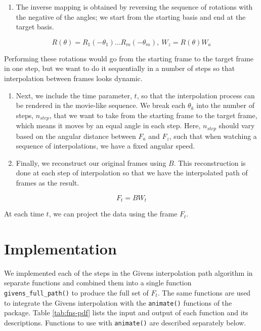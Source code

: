 \begin{enumerate}
\def\labelenumi{\arabic{enumi}.}
\setcounter{enumi}{3}
\tightlist
\item
  The inverse mapping is obtained by reversing the sequence of rotations with the negative of the angles; we start from the starting basis and end at the target basis.
\end{enumerate}

\[R(\theta) = R_1(-\theta_1) ... R_m(-\theta_m), \    W_z = R(\theta)W_a\]

Performing these rotations would go from the starting frame to the target frame in one step, but we want to do it sequentially in a number of steps so that interpolation between frames looks dynamic.

\begin{enumerate}
\def\labelenumi{\arabic{enumi}.}
\setcounter{enumi}{4}
\item
  Next, we include the time parameter, \(t\), so that the interpolation process can be rendered in the movie-like sequence. We break each \(\theta_k\) into the number of steps, \(n_{step}\), that we want to take from the starting frame to the target frame, which means it moves by an equal angle in each step. Here, \(n_{step}\) should vary based on the angular distance between \(F_a\) and \(F_z\), such that when watching a sequence of interpolations, we have a fixed angular speed.
\item
  Finally, we reconstruct our original frames using \(B\). This reconstruction is done at each step of interpolation so that we have the interpolated path of frames as the result.
\end{enumerate}

\[F_t = B  W_t\]

At each time \(t\), we can project the data using the frame \(F_t\).

\section{Implementation}\label{implementation}

We implemented each of the steps in the Givens interpolation path algorithm in separate functions and combined them into a single function \texttt{givens\_full\_path()} to produce the full set of \(F_t\). The same functions are used to integrate the Givens interpolation with the \texttt{animate()} functions of the  package. Table \ref{tab:fns-pdf} lists the input and output of each function and its descriptions. Functions to use with \texttt{animate()} are described separately below.

